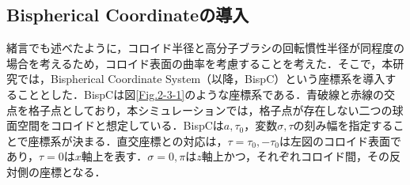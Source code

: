 \documentclass[10.5pt,a4j]{jarticle}
\begin{document}
\subsection{Bispherical Coordinateの導入}
緒言でも述べたように，コロイド半径と高分子ブラシの回転慣性半径が同程度の場合を考えるため，コロイド表面の曲率を考慮することを考えた．そこで，本研究では，Bispherical Coordinate System（以降，BispC）という座標系を導入することとした．BispCは図\ref{Fig.2-3-1}のような座標系である．青破線と赤線の交点を格子点としており，本シミュレーションでは，格子点が存在しない二つの球面空間をコロイドと想定している．BispCは$a, \tau_{0}$，変数$\sigma, \tau$の刻み幅を指定することで座標系が決まる．直交座標との対応は，$\tau=\tau_0, -\tau_0$は左図のコロイド表面であり，$\tau=0$は$x$軸上を表す．$\sigma=0,  \pi$は$z$軸上かつ，それぞれコロイド間，その反対側の座標となる．
%
\end{document}

